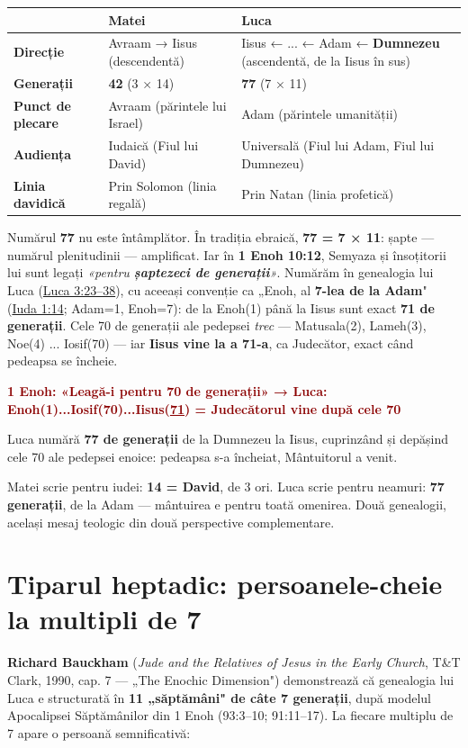\documentclass[12pt,a4paper,twoside,openany]{book}
\begin{document}
\begin{center}
\small
\begin{tabular}{L{2.3cm}L{4.1cm}L{8.5cm}}
\toprule
{}
 & \textbf{Matei} & \textbf{Luca} \\
\midrule
\textbf{Direcție} & Avraam → Iisus (descendentă) & Iisus ← ... ← Adam ← \textbf{Dumnezeu} (ascendentă, de la Iisus în sus) \\
\textbf{Generații} & \textbf{42} (3 × 14) & \textbf{77} (7 × 11) \\
\textbf{Punct de plecare} & Avraam (părintele lui Israel) & Adam (părintele umanității) \\
\textbf{Audiența} & Iudaică (Fiul lui David) & Universală (Fiul lui Adam, Fiul lui Dumnezeu) \\
\textbf{Linia davidică} & Prin Solomon (linia regală) & Prin Natan (linia profetică) \\
\bottomrule
\end{tabular}
\end{center}
\normalsize
Numărul \textbf{77} nu este întâmplător. În tradiția ebraică, \textbf{77 = 7 × 11}: șapte — numărul plenitudinii — amplificat. Iar în \textbf{1 Enoh 10:12}, Semyaza și însoțitorii lui sunt legați \textit{«pentru \textbf{șaptezeci de generații}»}. Numărăm în genealogia lui Luca (\href{https://bibliaortodoxa.ro/carte.php?id=48\&cap=3\#23}{Luca 3:23–38}), cu aceeași convenție ca „Enoh, al \textbf{7-lea de la Adam}" (\href{https://bibliaortodoxa.ro/carte.php?id=44\&cap=1\#14}{Iuda 1:14}; Adam=1, Enoh=7): de la Enoh(1) până la Iisus sunt exact \textbf{71 de generații}. Cele 70 de generații ale pedepsei \textit{trec} — Matusala(2), Lameh(3), Noe(4) ... Iosif(70) — iar \textbf{Iisus vine la a 71-a}, ca Judecător, exact când pedeapsa se încheie.

\textcolor{darkred}{\textbf{1 Enoh: «Leagă-i pentru 70 de generații» → Luca: Enoh(1)...Iosif(70)...Iisus(\underline{71}) = Judecătorul vine după cele 70}}

Luca numără \textbf{77 de generații} de la Dumnezeu la Iisus, cuprinzând și depășind cele 70 ale pedepsei enoice: pedeapsa s-a încheiat, Mântuitorul a venit.

Matei scrie pentru iudei: \textbf{14 = David}, de 3 ori. Luca scrie pentru neamuri: \textbf{77 generații}, de la Adam — mântuirea e pentru toată omenirea. Două genealogii, același mesaj teologic din două perspective complementare.


\section{Tiparul heptadic: persoanele-cheie la multipli de 7}
\textbf{Richard Bauckham} (\textit{Jude and the Relatives of Jesus in the Early Church}, T\&T Clark, 1990, cap. 7 — „The Enochic Dimension") demonstrează că genealogia lui Luca e structurată în \textbf{11 „săptămâni" de câte 7 generații}, după modelul Apocalipsei Săptămânilor din 1 Enoh (93:3–10; 91:11–17). La fiecare multiplu de 7 apare o persoană semnificativă:
\end{document}
